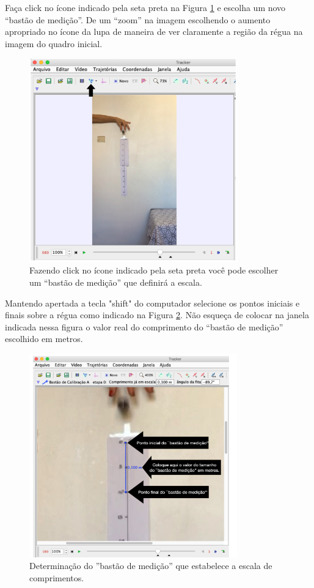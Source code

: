\documentclass[12pt]{article}
\begin{document}
Faça click no ícone indicado pela seta preta  na Figura \ref{fig5AppB} e escolha um novo 
``bastão de medição''. De um ``zoom'' na imagem escolhendo o aumento apropriado no ícone da lupa
de maneira de ver claramente a região da régua na imagem do quadro inicial.  
\begin{figure}[h!]
\includegraphics[width=9cm]{fig5AppB.pdf}
\caption{Fazendo click no ícone indicado pela seta preta você pode escolher um ``bastão de medição'' que definirá a escala.}
\label{fig5AppB}
\end{figure}
Mantendo apertada a tecla "shift" do computador selecione os pontos iniciais e finais sobre a régua
como indicado na Figura \ref{fig6AppB}. Não esqueça de colocar na janela indicada nessa figura o valor real do comprimento do ``bastão de medição'' escolhido em metros.
\begin{figure}[h!]
\includegraphics[width=9cm]{fig6AppB.pdf}
\caption{Determinação do ''bastão de medição'' que estabelece a escala de comprimentos.}
\label{fig6AppB}
\end{figure}
\end{document}
